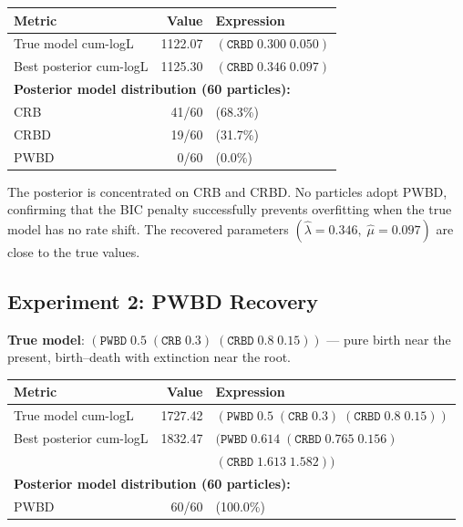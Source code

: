 \documentclass[11pt,a4paper]{article}
\begin{document}
\smallskip\noindent
\begin{tabular}{lrl}
\toprule
\textbf{Metric} & \textbf{Value} & \textbf{Expression} \\
\midrule
True model cum-logL     & 1122.07  & $(\texttt{CRBD}\; 0.300\; 0.050)$ \\
Best posterior cum-logL  & 1125.30  & $(\texttt{CRBD}\; 0.346\; 0.097)$ \\
\midrule
\multicolumn{3}{l}{\textbf{Posterior model distribution (60 particles):}} \\
\quad CRB  & 41/60 & (68.3\%) \\
\quad CRBD & 19/60 & (31.7\%) \\
\quad PWBD &  0/60 & (0.0\%) \\
\bottomrule
\end{tabular}

\smallskip
The posterior is concentrated on CRB and CRBD.
No particles adopt PWBD, confirming that the BIC penalty successfully prevents overfitting
when the true model has no rate shift.
The recovered parameters $(\hat\lambda=0.346,\; \hat\mu=0.097)$ are close to the true values.

\subsection{Experiment 2: PWBD Recovery}

\textbf{True model}: $(\texttt{PWBD}\; 0.5\; (\texttt{CRB}\; 0.3)\; (\texttt{CRBD}\; 0.8\; 0.15))$
--- pure birth near the present, birth--death with extinction near the root.

\smallskip\noindent
\begin{tabular}{lrl}
\toprule
\textbf{Metric} & \textbf{Value} & \textbf{Expression} \\
\midrule
True model cum-logL     & 1727.42  & $(\texttt{PWBD}\; 0.5\; (\texttt{CRB}\; 0.3)\; (\texttt{CRBD}\; 0.8\; 0.15))$ \\
Best posterior cum-logL  & 1832.47  & $(\texttt{PWBD}\; 0.614\; (\texttt{CRBD}\; 0.765\; 0.156)\;$ \\
                         &          & \quad $(\texttt{CRBD}\; 1.613\; 1.582))$ \\
\midrule
\multicolumn{3}{l}{\textbf{Posterior model distribution (60 particles):}} \\
\quad PWBD & 60/60 & (100.0\%) \\
\bottomrule
\end{tabular}
\end{document}
